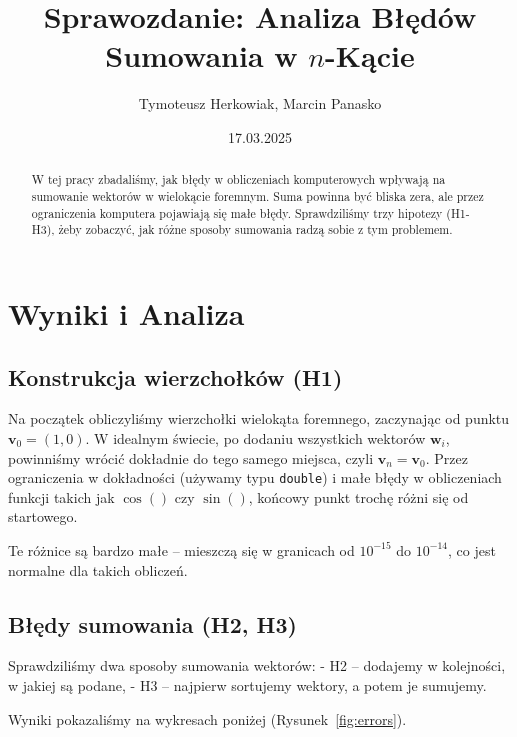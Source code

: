 \documentclass[a4paper,12pt]{article}
\title{Sprawozdanie: Analiza Błędów Sumowania w $n$-Kącie}
\author{Tymoteusz Herkowiak, Marcin Panasko}
\date{17.03.2025}
\begin{document}
\maketitle

\begin{abstract}
W tej pracy zbadaliśmy, jak błędy w obliczeniach komputerowych wpływają na sumowanie wektorów w wielokącie foremnym. Suma powinna być bliska zera, ale przez ograniczenia komputera pojawiają się małe błędy. Sprawdziliśmy trzy hipotezy (H1-H3), żeby zobaczyć, jak różne sposoby sumowania radzą sobie z tym problemem.
\end{abstract}

\section{Wyniki i Analiza}

\subsection{Konstrukcja wierzchołków (H1)}

Na początek obliczyliśmy wierzchołki wielokąta foremnego, zaczynając od punktu \( \mathbf{v}_0 = (1,0) \). W idealnym świecie, po dodaniu wszystkich wektorów \( \mathbf{w}_i \), powinniśmy wrócić dokładnie do tego samego miejsca, czyli \( \mathbf{v}_n = \mathbf{v}_0 \).  Przez ograniczenia w dokładności (używamy typu \texttt{double}) i małe błędy w obliczeniach funkcji takich jak \( \cos() \) czy \( \sin() \), końcowy punkt trochę różni się od startowego. 

Te różnice są bardzo małe – mieszczą się w granicach od \( 10^{-15} \) do \( 10^{-14} \), co jest normalne dla takich obliczeń.

\subsection{Błędy sumowania (H2, H3)}

Sprawdziliśmy dwa sposoby sumowania wektorów:  
- H2 – dodajemy w kolejności, w jakiej są podane,  
- H3 – najpierw sortujemy wektory, a potem je sumujemy.  

Wyniki pokazaliśmy na wykresach poniżej (Rysunek~\ref{fig:errors}).
\end{document}
